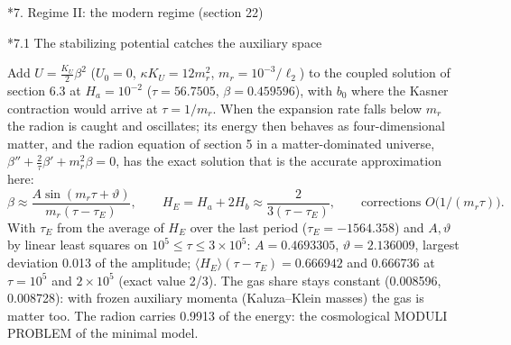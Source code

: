 \documentclass[10pt,a4paper]{article}
\makeatletter
\renewcommand\section{\@startsection{section}{1}{\z@}{-3.5ex \@plus -1ex \@minus -.2ex}{2.3ex \@plus.2ex}{\normalfont\Large\bfseries\raggedright}}
\renewcommand\subsection{\@startsection{subsection}{2}{\z@}{-3.25ex\@plus -1ex \@minus -.2ex}{1.5ex \@plus .2ex}{\normalfont\large\bfseries\raggedright}}
\makeatother
\begin{document}
\section*{7. Regime II: the modern regime (section 22)}
\subsection*{7.1 The stabilizing potential catches the auxiliary space}
Add $U=\tfrac{K_U}2\beta^2$ ($U_0=0$, $\kappa K_U=12m_r^2$, $m_r=10^{-3}/\ell_2$) to the coupled solution of section 6.3 at $H_a=10^{-2}$ ($\tau=56.7505$, $\beta=0.459596$), with $b_0$ where the Kasner contraction would arrive at $\tau=1/m_r$. When the expansion rate falls below $m_r$ the radion is caught and oscillates; its energy then behaves as four-dimensional matter, and the radion equation of section 5 in a matter-dominated universe, $\beta''+\frac2\tau\beta'+m_r^2\beta=0$, has the exact solution that is the accurate approximation here:
\begin{equation*}
\beta\approx\frac{A\sin(m_r\tau+\vartheta)}{m_r(\tau-\tau_E)},\qquad H_E=H_a+2H_b\approx\frac{2}{3(\tau-\tau_E)},\qquad\text{corrections }O\big(1/(m_r\tau)\big).
\end{equation*}
With $\tau_E$ from the average of $H_E$ over the last period ($\tau_E=-1564.358$) and $A,\vartheta$ by linear least squares on $10^5\le\tau\le3\times10^5$: $A=0.4693305$, $\vartheta=2.136009$, largest deviation 0.013 of the amplitude; $\langle H_E\rangle(\tau-\tau_E)=0.666942$ and 0.666736 at $\tau=10^5$ and $2\times10^5$ (exact value 2/3). The gas share stays constant (0.008596, 0.008728): with frozen auxiliary momenta (Kaluza–Klein masses) the gas is matter too. The radion carries 0.9913 of the energy: the cosmological MODULI PROBLEM of the minimal model.
\end{document}
